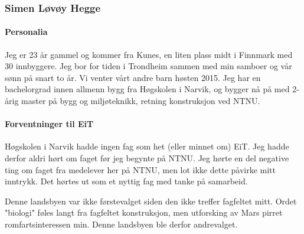 \subsubsection{Simen Løvøy Hegge}

\paragraph{Personalia}
Jeg er 23 år gammel og kommer fra Kunes, en liten plass midt i Finnmark med 30 innbyggere.
Jeg bor for tiden i Trondheim sammen med min samboer og vår sønn på snart to år.
Vi venter vårt andre barn høsten 2015.
Jeg har en bachelorgrad innen allmenn bygg fra Høgskolen i Narvik, og bygger nå på med 2-årig master på bygg og miljøteknikk, retning konstruksjon ved NTNU.

\paragraph{Forventninger til EiT}
Høgskolen i Narvik hadde ingen fag som het (eller minnet om) EiT.
Jeg hadde derfor aldri hørt om faget før jeg begynte på NTNU.
Jeg hørte en del negative ting om faget fra medelever her på NTNU, men lot ikke dette påvirke mitt inntrykk. 
Det hørtes ut som et nyttig fag med tanke på samarbeid.

Denne landsbyen var ikke førstevalget siden den ikke treffer fagfeltet mitt.
Ordet "biologi" føles langt fra fagfeltet konstruksjon, men utforsking av Mars pirret romfartsinteressen min.
Denne landsbyen ble derfor andrevalget.
